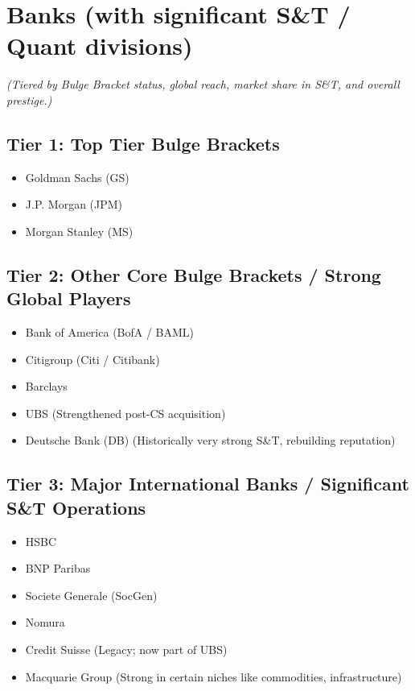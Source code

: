 \documentclass[11pt,a4paper]{article}
\begin{document}
\section*{Banks (with significant S\&T / Quant divisions)}
\begin{center}
\footnotesize
\textit{(Tiered by Bulge Bracket status, global reach, market share in S\&T, and overall prestige.)}
\end{center}

\subsection*{Tier 1: Top Tier Bulge Brackets}
\begin{multicols}{3}
\begin{itemize}[label=\textbullet, leftmargin=*, itemsep=1pt, parsep=0pt]
    \item Goldman Sachs (GS)
    \item J.P. Morgan (JPM)
    \item Morgan Stanley (MS)
\end{itemize}
\end{multicols}

\subsection*{Tier 2: Other Core Bulge Brackets / Strong Global Players}
\begin{multicols}{3}
\begin{itemize}[label=\textbullet, leftmargin=*, itemsep=1pt, parsep=0pt]
    \item Bank of America (BofA / BAML)
    \item Citigroup (Citi / Citibank)
    \item Barclays
    \item UBS (Strengthened post-CS acquisition)
    \item Deutsche Bank (DB) (Historically very strong S\&T, rebuilding reputation)
\end{itemize}
\end{multicols}

\subsection*{Tier 3: Major International Banks / Significant S\&T Operations}
\begin{multicols}{3}
\begin{itemize}[label=\textbullet, leftmargin=*, itemsep=1pt, parsep=0pt]
    \item HSBC
    \item BNP Paribas
    \item Societe Generale (SocGen)
    \item Nomura
    \item Credit Suisse (Legacy; now part of UBS)
    \item Macquarie Group (Strong in certain niches like commodities, infrastructure)
\end{itemize}
\end{multicols}
\end{document}
